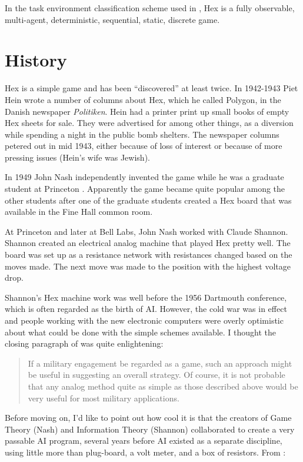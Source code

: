 \documentclass[12pt,titlepage]{amsart}
\begin{document}
In the task environment classification scheme used in \cite{RN:AIAMA:2003}, Hex
is a fully observable, multi-agent, deterministic, sequential, static, discrete
game.

\section{History}

Hex is a simple game and has been ``discovered'' at least twice. In 1942-1943
Piet Hein wrote a number of columns about Hex, which he called Polygon, in the
Danish newspaper \emph{Politiken}. Hein had a printer print up small books of
empty Hex sheets for sale. They were advertised for among other things, as a
diversion while spending a night in the public bomb shelters. The newspaper
columns petered out in mid 1943, either because of loss of interest or because
of more pressing issues (Hein's wife was Jewish).

In 1949 John Nash independently invented the game while he was a graduate
student at Princeton \cite{Nash:1952:Games}. Apparently the game became quite
popular among the other students after one of the graduate students created a
Hex board that was available in the Fine Hall common room.

At Princeton and later at Bell Labs, John Nash worked with Claude Shannon.
Shannon created an electrical analog machine that played Hex pretty well. The
board was set up as a resistance network with resistances changed based on the
moves made. The next move was made to the position with the highest voltage
drop.

Shannon's Hex machine work was well before the 1956 Dartmouth conference, which
is often regarded as the birth of AI. However, the cold war was in effect and
people working with the new electronic computers were overly optimistic about
what could be done with the simple schemes available. I thought the closing
paragraph  of \cite{Nash:1952:Games} was quite enlightening:

\begin{quote}
If a military engagement be regarded as a game, such an approach might be useful
in suggesting an overall strategy. Of course, it is not probable that any analog
method quite as simple as those described above would be very useful for most
military applications.
\end{quote}

Before moving on, I'd like to point out how cool it is that the
creators of Game Theory (Nash) and Information Theory (Shannon)
collaborated to create a very passable AI program, several years
before AI existed as a separate discipline, using little more than
plug-board, a volt meter, and a box of resistors. From \cite{Nash:1952:Games}:
\end{document}
